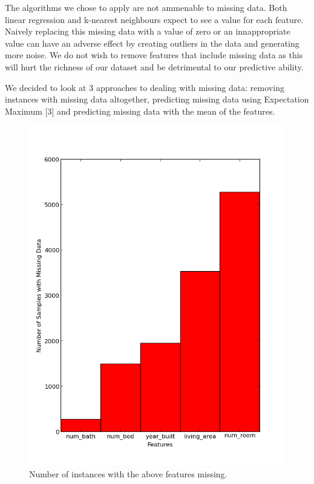 \documentclass{acm_proc_article-sp}
\begin{document}
	The algorithms we chose to apply are not ammenable to missing data. Both linear regression and k-nearest neighbours expect to see a value for each feature. Naively replacing this missing data with a value of zero or an innappropriate value can have an adverse effect by creating outliers in the data and generating more noise. We do not wish to remove features that include missing data as this will hurt the richness of our dataset and be detrimental to our predictive ability.
	
	We decided to look at 3 approaches to dealing with missing data: removing instances with missing data altogether, predicting missing data using Expectation Maximum [3] and predicting missing data with the mean of the features. 
	
	\begin{figure}[h!]
   		\centering
  		\includegraphics[width=\linewidth]{missing_data.png}
    		\caption{Number of instances with the above features missing. }
    		\label{fig:missingdata}
	\end{figure}
	
\end{document}
